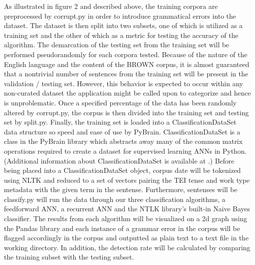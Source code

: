 \documentclass{article}
\begin{document}
As illustrated in figure 2 and described above, the training corpora are preprocessed by corrupt.py in order to introduce grammatical errors into the dataset. The dataset is then split into two subsets, one of which is utilized as a training set and the other of which as a metric for testing the accuracy of the algorithm. The demarcation of the testing set from the training set will be performed pseudorandomly for each corpora tested. Because of the nature of the English language and the content of the BROWN corpus, it is almost guaranteed that a nontrivial number of sentences from the training set will be present in the validation / testing set. However, this behavior is expected to occur within any non-curated dataset the application might be called upon to categorize and hence is unproblematic.  Once a specified percentage of the data has been randomly altered by corrupt.py, the corpus is then divided into the training set and testing set by split.py. Finally, the training set is loaded into a ClassificationDataSet data structure so speed and ease of use by PyBrain. ClassificationDataSet is a class in the PyBrain library which abstracts away many of the common matrix operations required to create a dataset for supervised learning ANNs in Python. (Additional information about ClassificationDataSet is available at  \citep{ClassifyPyBrain}.) Before being placed into a ClassificationDataSet object, corpus date will be tokenized using NLTK and reduced to a set of vectors pairing the TEI tense and work type metadata with the given term in the sentense. Furthermore, sentenses will be   classify.py will run the data through our three classification algorithms, a feedforward ANN, a recurrent ANN and the NTLK library's built-in Naive Bayes classifier. The results from each algorithm will be visualized on a 2d graph using the Pandas library \citep{PANDASpy} and each instance of a grammar error in the corpus will be flagged accordingly in the corpus and outputted as plain text to a text file in the working directory. In addition, the detection rate will be calculated by comparing the training subset with the testing subset.
\end{document}
